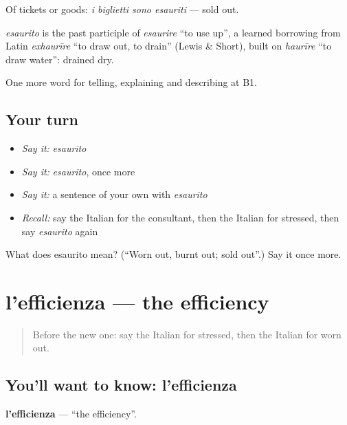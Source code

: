 Of tickets or goods: \emph{i biglietti sono esauriti} — sold out.

\begin{cousinweb}
\emph{esaurito} is the past participle of \emph{esaurire} \textquotedblleft{}to use up\textquotedblright{}, a learned borrowing from Latin \emph{exhaurīre} \textquotedblleft{}to draw out, to drain\textquotedblright{} (Lewis \& Short), built on \emph{haurīre} \textquotedblleft{}to draw water\textquotedblright{}: drained dry.
\end{cousinweb}

\begin{grammarlens}[title={What you've built}]
One more word for telling, explaining and describing at B1.
\end{grammarlens}

\subsection*{Your turn}
\begin{itemize}
\raggedright
  \item \emph{Say it:} \emph{esaurito}
  \item \emph{Say it:} \emph{esaurito}, once more
  \item \emph{Say it:} a sentence of your own with \emph{esaurito}
  \item \emph{Recall:} say the Italian for the consultant, then the Italian for stressed, then say \emph{esaurito} again
\end{itemize}

\begin{tcolorbox}[breakable,colback=teal!4,colframe=teal!35!black,title={Before you move on}]
What does esaurito mean? (\textquotedblleft{}Worn out, burnt out; sold out\textquotedblright{}.) Say it once more.
\end{tcolorbox}
\section[l'efficienza]{l'efficienza — the efficiency}

\label{lesson:IT-C362-efficienza}



\begin{quote}
Before the new one: say the Italian for stressed, then the Italian for worn out.
\end{quote}

\subsection*{You'll want to know: l'efficienza}
\textbf{l'efficienza} — \textquotedblleft{}the efficiency\textquotedblright{}.

